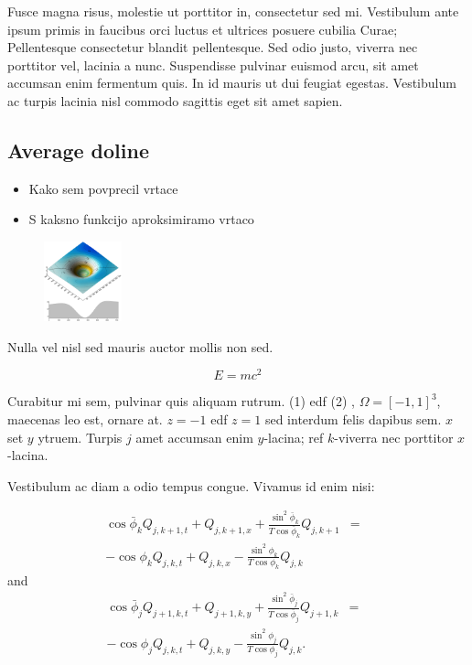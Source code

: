 \documentclass[a0,portrait]{a0poster}
\begin{document}
\begin{multicols}{2}
Fusce magna risus, molestie ut porttitor in, consectetur sed mi. Vestibulum ante ipsum primis in faucibus orci luctus et ultrices posuere cubilia Curae; Pellentesque consectetur blandit pellentesque. Sed odio justo, viverra nec porttitor vel, lacinia a nunc. Suspendisse pulvinar euismod arcu, sit amet accumsan enim fermentum quis. In id mauris ut dui feugiat egestas. Vestibulum ac turpis lacinia nisl commodo sagittis eget sit amet sapien.


\subsection*{Average doline}

\begin{itemize}
	\item Kako sem povprecil vrtace
	\item S kaksno funkcijo aproksimiramo vrtaco
\end{itemize}

\begin{figure}
\begin{center}
	\includegraphics[width=0.2\textwidth]{menisija-vrtaca.png}
\end{center}
\end{figure}

Nulla vel nisl sed mauris auctor mollis non sed. 

\begin{equation}
E = mc^{2}
\label{eqn:Einstein}
\end{equation}

Curabitur mi sem, pulvinar quis aliquam rutrum. (1) edf (2)
, $\Omega=[-1,1]^3$, maecenas leo est, ornare at. $z=-1$ edf $z=1$ sed interdum felis dapibus sem. $x$ set $y$ ytruem. 
Turpis $j$ amet accumsan enim $y$-lacina; 
ref $k$-viverra nec porttitor $x$-lacina. 

Vestibulum ac diam a odio tempus congue. Vivamus id enim nisi:

\begin{eqnarray}
\cos\bar{\phi}_k Q_{j,k+1,t} + Q_{j,k+1,x}+\frac{\sin^2\bar{\phi}_k}{T\cos\bar{\phi}_k} Q_{j,k+1} &=&\nonumber\\ 
-\cos\phi_k Q_{j,k,t} + Q_{j,k,x}-\frac{\sin^2\phi_k}{T\cos\phi_k} Q_{j,k}\label{edgek}
\end{eqnarray}
and
\begin{eqnarray}
\cos\bar{\phi}_j Q_{j+1,k,t} + Q_{j+1,k,y}+\frac{\sin^2\bar{\phi}_j}{T\cos\bar{\phi}_j} Q_{j+1,k}&=&\nonumber \\
-\cos\phi_j Q_{j,k,t} + Q_{j,k,y}-\frac{\sin^2\phi_j}{T\cos\phi_j} Q_{j,k}.\label{edgej}
\end{eqnarray} 


\end{multicols}
\end{document}
